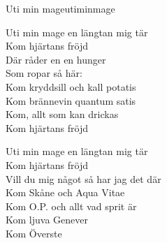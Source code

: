 \begin{song}{Uti min mage}{utiminmage}
\begin{vers}
Uti min mage en längtan mig tär\\
Kom hjärtans fröjd\\
Där råder en en hunger\\
Som ropar så här:\\
Kom kryddsill och kall potatis\\
Kom brännevin quantum satis\\
Kom, allt som kan drickas\\
Kom hjärtans fröjd\\
\end{vers}
\begin{vers}
Uti min mage en längtan mig tär\\
Kom hjärtans fröjd\\
Vill du mig något så har jag det där\\
Kom Skåne och Aqua Vitae\\
Kom O.P. och allt vad sprit är\\
Kom ljuva Genever\\
Kom Överste\\
\end{vers}
\end{song}
